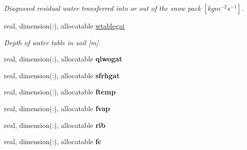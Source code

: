 \begin{DoxyCompactItemize}
\begin{DoxyCompactList}\small\item\em Diagnosed residual water transferred into or out of the snow pack $[kg m^{-2} s^{-1} ]$. \end{DoxyCompactList}\item 
\hypertarget{structclass__statevars_1_1class__gather_af35b83194880929af322de664c9438e6}{}real, dimension(\+:), allocatable \hyperlink{structclass__statevars_1_1class__gather_af35b83194880929af322de664c9438e6}{wtablegat}\label{structclass__statevars_1_1class__gather_af35b83194880929af322de664c9438e6}

\begin{DoxyCompactList}\small\item\em Depth of water table in soil \mbox{[}m\mbox{]}. \end{DoxyCompactList}\item 
\hypertarget{structclass__statevars_1_1class__gather_a23bade405932a198575a77d41de87820}{}real, dimension(\+:), allocatable {\bfseries qlwogat}\label{structclass__statevars_1_1class__gather_a23bade405932a198575a77d41de87820}

\item 
\hypertarget{structclass__statevars_1_1class__gather_a073ccc6d7a5429ac870da1a74127231d}{}real, dimension(\+:), allocatable {\bfseries sfrhgat}\label{structclass__statevars_1_1class__gather_a073ccc6d7a5429ac870da1a74127231d}

\item 
\hypertarget{structclass__statevars_1_1class__gather_a0575c54d140c7204d7fce94bc52dba7f}{}real, dimension(\+:), allocatable {\bfseries ftemp}\label{structclass__statevars_1_1class__gather_a0575c54d140c7204d7fce94bc52dba7f}

\item 
\hypertarget{structclass__statevars_1_1class__gather_a57e78628d5484c93f4a3d8384b573954}{}real, dimension(\+:), allocatable {\bfseries fvap}\label{structclass__statevars_1_1class__gather_a57e78628d5484c93f4a3d8384b573954}

\item 
\hypertarget{structclass__statevars_1_1class__gather_a6635ec871e7197b11e805621c4fb7bd8}{}real, dimension(\+:), allocatable {\bfseries rib}\label{structclass__statevars_1_1class__gather_a6635ec871e7197b11e805621c4fb7bd8}

\item 
\hypertarget{structclass__statevars_1_1class__gather_a5ca4be98bfc572bac7eca52d726f8294}{}real, dimension(\+:), allocatable {\bfseries fc}\label{structclass__statevars_1_1class__gather_a5ca4be98bfc572bac7eca52d726f8294}


\end{DoxyCompactItemize}
